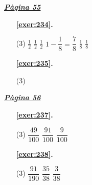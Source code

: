 \hyperlink{page.55}{\textbf{\em Pàgina 55}}
\begin{enumerate}



 \item[\fontfamily{phv}\selectfont\color{blue}\textbf{\ref{exer:234}. }] \label{ans:234}
 \begin{tasks}[column-sep=1em, item-indent=1.3333em](3)
	 \task $\frac {1}{2}$
	 \task $\frac {1}{2}$
	 \task $\frac {1}{2}$
	 \task* $1-\dfrac {1}{8}=\dfrac {7}{8}$
	 \task $\frac {1}{8}$
	 \task $\frac {1}{8}$
\end{tasks}
 \end{enumerate}
\begin{enumerate}



 \item[\fontfamily{phv}\selectfont\color{blue}\textbf{\ref{exer:235}. }] \label{ans:235}
 \begin{tasks}[column-sep=1em, item-indent=1.3333em](3)
\end{tasks}
 \end{enumerate}
\vspace{0.3cm}


\hyperlink{page.56}{\textbf{\em Pàgina 56}}
\begin{enumerate}



 \item[\fontfamily{phv}\selectfont\color{blue}\textbf{\ref{exer:237}. }] \label{ans:237}
 \begin{tasks}[column-sep=1em, item-indent=1.3333em](3)
	 \task $\dfrac {49}{100}$
	 \task $\dfrac {91}{100}$
	 \task $\dfrac {9}{100}$
\end{tasks}
 \end{enumerate}
\begin{enumerate}



 \item[\fontfamily{phv}\selectfont\color{blue}\textbf{\ref{exer:238}. }] \label{ans:238}
 \begin{tasks}[column-sep=1em, item-indent=1.3333em](3)
	 \task $\dfrac {91}{190}$
	 \task $\dfrac {35}{38}$
	 \task $\dfrac {3}{38}$
\end{tasks}
 \end{enumerate}
\vspace{0.3cm}

